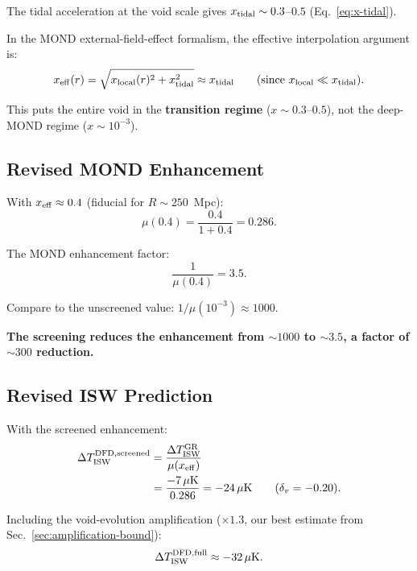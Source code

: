 \documentclass[11pt,a4paper]{article}
\newcommand{\mufd}{\mu}
\begin{document}
The tidal acceleration at the void scale gives $x_{\rm tidal} \sim
0.3$--$0.5$ (Eq.~\ref{eq:x-tidal}).

In the MOND external-field-effect formalism, the effective
interpolation argument is:
\begin{equation}
x_{\rm eff}(r) = \sqrt{x_{\rm local}(r)^2 + x_{\rm tidal}^2}
\approx x_{\rm tidal}
\qquad (\text{since } x_{\rm local} \ll x_{\rm tidal}).
\label{eq:x-eff}
\end{equation}

This puts the entire void in the \textbf{transition regime}
($x \sim 0.3$--$0.5$), not the deep-MOND regime ($x \sim 10^{-3}$).

\subsection{Revised MOND Enhancement}

With $x_{\rm eff} \approx 0.4$ (fiducial for $R \sim 250$~Mpc):
\begin{equation}
\mufd(0.4) = \frac{0.4}{1+0.4} = 0.286.
\end{equation}

The MOND enhancement factor:
\begin{equation}
\frac{1}{\mufd(0.4)} = 3.5.
\end{equation}

Compare to the unscreened value: $1/\mufd(10^{-3}) \approx 1000$.

\textbf{The screening reduces the enhancement from $\sim 1000$
to $\sim 3.5$, a factor of $\sim 300$ reduction.}

\subsection{Revised ISW Prediction}

With the screened enhancement:
\begin{align}
\Delta T_{\rm ISW}^{\rm DFD,screened}
&= \frac{\Delta T_{\rm ISW}^{\rm GR}}{\mufd(x_{\rm eff})}
\nonumber\\
&= \frac{-7\,\mu\text{K}}{0.286}
= -24\,\mu\text{K}
\qquad (\delta_v = -0.20).
\label{eq:ISW-screened}
\end{align}

Including the void-evolution amplification ($\times 1.3$, our
best estimate from Sec.~\ref{sec:amplification-bound}):
\begin{equation}
\Delta T_{\rm ISW}^{\rm DFD,full}
\approx -32\,\mu\text{K}.
\end{equation}
\end{document}
